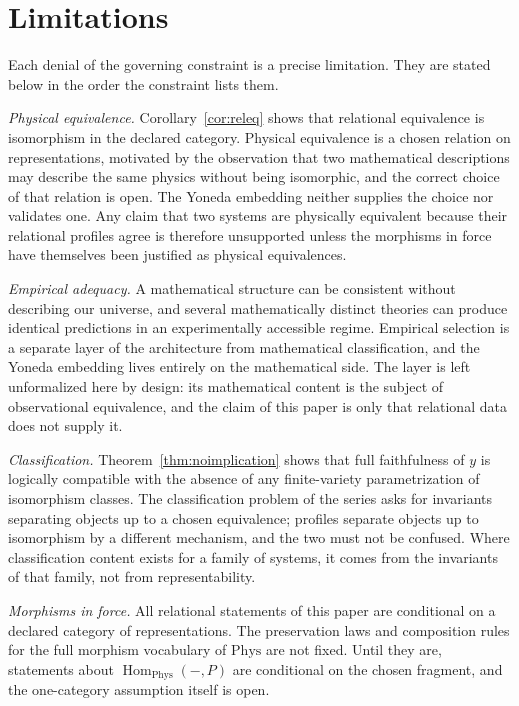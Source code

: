 \documentclass[11pt,letterpaper]{article}
\DeclareMathOperator{\Hom}{Hom}
\theoremstyle{definition}
\theoremstyle{remark}
\begin{document}
\section{Limitations}
\label{sec:limitations}

Each denial of the governing constraint is a precise limitation. They are stated below in the order the constraint lists them.

\emph{Physical equivalence.} Corollary~\ref{cor:releq} shows that relational equivalence is isomorphism in the declared category. Physical equivalence is a chosen relation on representations, motivated by the observation that two mathematical descriptions may describe the same physics without being isomorphic, and the correct choice of that relation is open. The Yoneda embedding neither supplies the choice nor validates one. Any claim that two systems are physically equivalent because their relational profiles agree is therefore unsupported unless the morphisms in force have themselves been justified as physical equivalences.

\emph{Empirical adequacy.} A mathematical structure can be consistent without describing our universe, and several mathematically distinct theories can produce identical predictions in an experimentally accessible regime. Empirical selection is a separate layer of the architecture from mathematical classification, and the Yoneda embedding lives entirely on the mathematical side. The layer is left unformalized here by design: its mathematical content is the subject of observational equivalence, and the claim of this paper is only that relational data does not supply it.

\emph{Classification.} Theorem~\ref{thm:noimplication} shows that full faithfulness of $y$ is logically compatible with the absence of any finite-variety parametrization of isomorphism classes. The classification problem of the series asks for invariants separating objects up to a chosen equivalence; profiles separate objects up to isomorphism by a different mechanism, and the two must not be confused. Where classification content exists for a family of systems, it comes from the invariants of that family, not from representability.

\emph{Morphisms in force.} All relational statements of this paper are conditional on a declared category of representations. The preservation laws and composition rules for the full morphism vocabulary of $\mathrm{Phys}$ are not fixed. Until they are, statements about $\Hom_{\mathrm{Phys}}(-, P)$ are conditional on the chosen fragment, and the one-category assumption itself is open.
\end{document}
